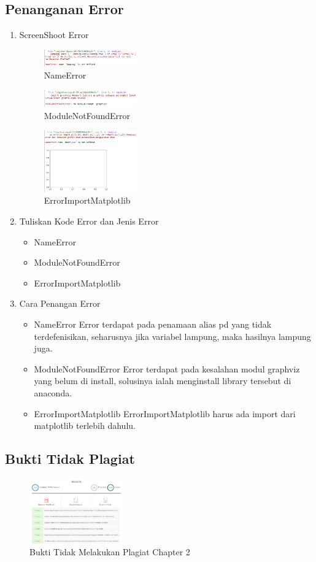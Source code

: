 \subsection{Penanganan Error}
\begin{enumerate}
	\item ScreenShoot Error
	\begin{figure}[H]
		\includegraphics[width=4cm]{figures/1174008/2/errorname.PNG}
		\centering
		\caption{NameError}
	\end{figure}
	\begin{figure}[H]
		\includegraphics[width=4cm]{figures/1174008/2/notmoduleerror.PNG}
		\centering
		\caption{ModuleNotFoundError}
	\end{figure}
	\begin{figure}[H]
		\includegraphics[width=4cm]{figures/1174008/2/errorimportmatplotlib.PNG}
		\centering
		\caption{ErrorImportMatplotlib}
	\end{figure}
	\item Tuliskan Kode Error dan Jenis Error
	\begin{itemize}
		\item NameError
		\item ModuleNotFoundError
		\item ErrorImportMatplotlib
	\end{itemize}

	\item Cara Penangan Error
	\begin{itemize}
		\item NameError
		\hfill\break
		Error terdapat pada penamaan alias pd yang tidak terdefenisikan, seharusnya jika variabel lampung, maka hasilnya lampung juga.
		\item ModuleNotFoundError
		\hfill\break
		Error terdapat pada kesalahan modul graphviz yang belum di install, solusinya ialah menginstall library tersebut di anaconda.
		\item ErrorImportMatplotlib
		\hfill\break
		ErrorImportMatplotlib harus ada import dari matplotlib terlebih dahulu.
	\end{itemize}
\end{enumerate}

\subsection{Bukti Tidak Plagiat}
\begin{figure}[H]
\centering
	\includegraphics[width=4cm]{figures/1174008/2/tidakplagiatchapter2.PNG}
	\caption{Bukti Tidak Melakukan Plagiat Chapter 2}
\end{figure}